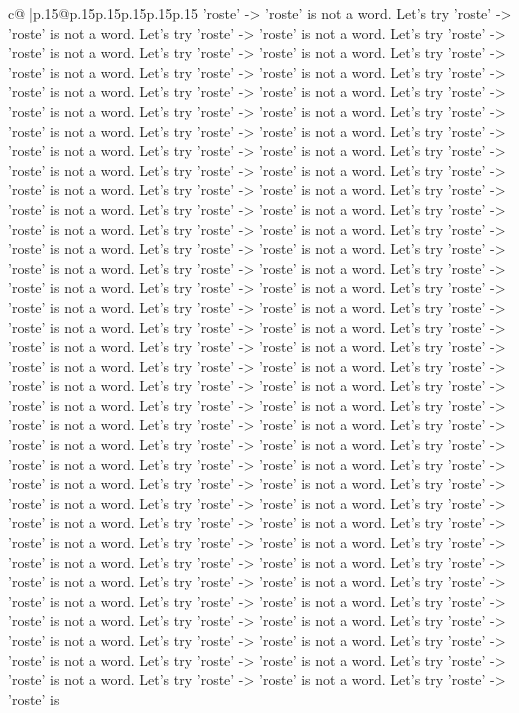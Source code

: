\documentclass{article}
\begin{document}
{\begin{supertabular}{c@{$\;$}|p{.15\linewidth}@{}p{.15\linewidth}p{.15\linewidth}p{.15\linewidth}p{.15\linewidth}p{.15\linewidth}}
{{{'roste' {-}> 'roste' is not a word. Let's try 'roste' {-}> 'roste' is not a word. Let's try 'roste' {-}> 'roste' is not a word. Let's try 'roste' {-}> 'roste' is not a word. Let's try 'roste' {-}> 'roste' is not a word. Let's try 'roste' {-}> 'roste' is not a word. Let's try 'roste' {-}> 'roste' is not a word. Let's try 'roste' {-}> 'roste' is not a word. Let's try 'roste' {-}> 'roste' is not a word. Let's try 'roste' {-}> 'roste' is not a word. Let's try 'roste' {-}> 'roste' is not a word. Let's try 'roste' {-}> 'roste' is not a word. Let's try 'roste' {-}> 'roste' is not a word. Let's try 'roste' {-}> 'roste' is not a word. Let's try 'roste' {-}> 'roste' is not a word. Let's try 'roste' {-}> 'roste' is not a word. Let's try 'roste' {-}> 'roste' is not a word. Let's try 'roste' {-}> 'roste' is not a word. Let's try 'roste' {-}> 'roste' is not a word. Let's try 'roste' {-}> 'roste' is not a word. Let's try 'roste' {-}> 'roste' is not a word. Let's try 'roste' {-}> 'roste' is not a word. Let's try 'roste' {-}> 'roste' is not a word. Let's try 'roste' {-}> 'roste' is not a word. Let's try 'roste' {-}> 'roste' is not a word. Let's try 'roste' {-}> 'roste' is not a word. Let's try 'roste' {-}> 'roste' is not a word. Let's try 'roste' {-}> 'roste' is not a word. Let's try 'roste' {-}> 'roste' is not a word. Let's try 'roste' {-}> 'roste' is not a word. Let's try 'roste' {-}> 'roste' is not a word. Let's try 'roste' {-}> 'roste' is not a word. Let's try 'roste' {-}> 'roste' is not a word. Let's try 'roste' {-}> 'roste' is not a word. Let's try 'roste' {-}> 'roste' is not a word. Let's try 'roste' {-}> 'roste' is not a word. Let's try 'roste' {-}> 'roste' is not a word. Let's try 'roste' {-}> 'roste' is not a word. Let's try 'roste' {-}> 'roste' is not a word. Let's try 'roste' {-}> 'roste' is not a word. Let's try 'roste' {-}> 'roste' is not a word. Let's try 'roste' {-}> 'roste' is not a word. Let's try 'roste' {-}> 'roste' is not a word. Let's try 'roste' {-}> 'roste' is not a word. Let's try 'roste' {-}> 'roste' is not a word. Let's try 'roste' {-}> 'roste' is not a word. Let's try 'roste' {-}> 'roste' is not a word. Let's try 'roste' {-}> 'roste' is not a word. Let's try 'roste' {-}> 'roste' is not a word. Let's try 'roste' {-}> 'roste' is not a word. Let's try 'roste' {-}> 'roste' is not a word. Let's try 'roste' {-}> 'roste' is not a word. Let's try 'roste' {-}> 'roste' is not a word. Let's try 'roste' {-}> 'roste' is not a word. Let's try 'roste' {-}> 'roste' is not a word. Let's try 'roste' {-}> 'roste' is not a word. Let's try 'roste' {-}> 'roste' is not a word. Let's try 'roste' {-}> 'roste' is not a word. Let's try 'roste' {-}> 'roste' is not a word. Let's try 'roste' {-}> 'roste' is not a word. Let's try 'roste' {-}> 'roste' is not a word. Let's try 'roste' {-}> 'roste' is not a word. Let's try 'roste' {-}> 'roste' is not a word. Let's try 'roste' {-}> 'roste' is not a word. Let's try 'roste' {-}> 'roste' is not a word. Let's try 'roste' {-}> 'roste' is not a word. Let's try 'roste' {-}> 'roste' is not a word. Let's try 'roste' {-}> 'roste' is not a word. Let's try 'roste' {-}> 'roste' is not a word. Let's try 'roste' {-}> 'roste' is }}}
\end{supertabular}}
\end{document}
